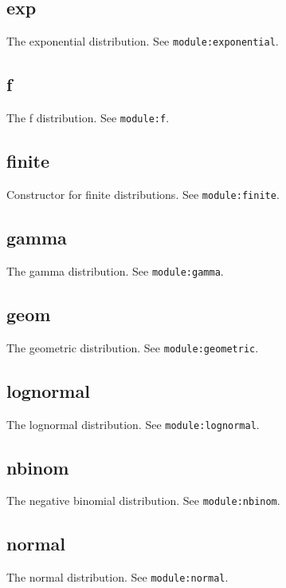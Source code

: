 \documentclass{article}
\begin{document}
    \subsection*{exp}
    The exponential distribution. See \texttt{module:exponential}.


    \subsection*{f}
    The f distribution. See \texttt{module:f}.


    \subsection*{finite}
    Constructor for finite distributions. See \texttt{module:finite}.


    \subsection*{gamma}
    The gamma distribution. See \texttt{module:gamma}.


    \subsection*{geom}
    The geometric distribution. See \texttt{module:geometric}.


    \subsection*{lognormal}
    The lognormal distribution. See \texttt{module:lognormal}.


    \subsection*{nbinom}
    The negative binomial distribution. See \texttt{module:nbinom}.


    \subsection*{normal}
    The normal distribution. See \texttt{module:normal}.
\end{document}

